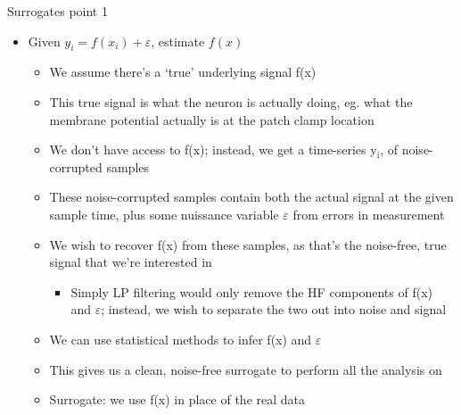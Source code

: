 \documentclass[presentation]{beamer}
\begin{document}
\begin{frame}[plain,label={sec:orga19232b}]{Surrogates point 1}
\begin{itemize}
\item Given \(y_i = f(x_i) + \varepsilon\), estimate \(f(x)\)
\begin{itemize}
\item We assume there's a `true' underlying signal f(x)
\item This true signal is what the neuron is actually doing, eg. what the membrane potential actually is at the patch clamp location
\item We don't have access to f(x); instead, we get a time-series y\(_{\text{i}}\), of noise-corrupted samples
\item These noise-corrupted samples contain both the actual signal at the given sample time, plus some nuissance variable \(\varepsilon\) from errors in measurement
\item We wish to recover f(x) from these samples, as that's the noise-free, true signal that we're interested in
\begin{itemize}
\item Simply LP filtering would only remove the HF components of f(x) and \(\varepsilon\); instead, we wish to separate the two out into noise and signal
\end{itemize}
\item We can use statistical methods to infer f(x) and \(\varepsilon\)
\item This gives us a clean, noise-free surrogate to perform all the analysis on
\item Surrogate: we use f(x) in place of the real data
\end{itemize}
\end{itemize}
\end{frame}
\end{document}
